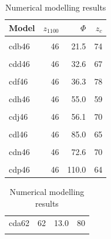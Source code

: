 \documentclass[draft,linenumbers]{agujournal2018} %
\providecommand{\DIFaddbegin}{} %
\providecommand{\DIFdelend}{} %
\newcommand{\DIFaddincludegraphics}[2][]{{\color{blue}\fbox{\DIFOincludegraphics[#1]{#2}}}} %
\DeclareRobustCommand{\DIFaddbegin}{\DIFOaddbegin \let\includegraphics\DIFaddincludegraphics} %
\DeclareRobustCommand{\DIFdelend}{\DIFOaddend \let\includegraphics\DIFOincludegraphics} %
\begin{document}
\DIFdelend \DIFaddbegin \begin{landscape}\begin{table}
\caption{\label{tab:zc.results}Numerical modelling results}

\centering
\fontsize{8}{10}\selectfont
\begin{tabular}[t]{lrrr}
\toprule
Model & $z_{1100}$ & $\Phi$ & \vphantom{3} $z_c$\\
\midrule
\cellcolor{gray!6}{cda46} & \cellcolor{gray!6}{46} & \cellcolor{gray!6}{13.0} & \cellcolor{gray!6}{66}\\
cdb46 & 46 & 21.5 & 74\\
\cellcolor{gray!6}{cdc46} & \cellcolor{gray!6}{46} & \cellcolor{gray!6}{26.1} & \cellcolor{gray!6}{69}\\
cdd46 & 46 & 32.6 & 67\\
\cellcolor{gray!6}{cde46} & \cellcolor{gray!6}{46} & \cellcolor{gray!6}{22.0} & \cellcolor{gray!6}{72}\\
\addlinespace
cdf46 & 46 & 36.3 & 78\\
\cellcolor{gray!6}{cdg46} & \cellcolor{gray!6}{46} & \cellcolor{gray!6}{44.0} & \cellcolor{gray!6}{78}\\
cdh46 & 46 & 55.0 & 59\\
\cellcolor{gray!6}{cdi46} & \cellcolor{gray!6}{46} & \cellcolor{gray!6}{34.0} & \cellcolor{gray!6}{80}\\
cdj46 & 46 & 56.1 & 70\\
\addlinespace
\cellcolor{gray!6}{cdk46} & \cellcolor{gray!6}{46} & \cellcolor{gray!6}{68.0} & \cellcolor{gray!6}{58}\\
cdl46 & 46 & 85.0 & 65\\
\cellcolor{gray!6}{cdm46} & \cellcolor{gray!6}{46} & \cellcolor{gray!6}{44.0} & \cellcolor{gray!6}{79}\\
cdn46 & 46 & 72.6 & 70\\
\cellcolor{gray!6}{cdo46} & \cellcolor{gray!6}{46} & \cellcolor{gray!6}{88.0} & \cellcolor{gray!6}{68}\\
\addlinespace
cdp46 & 46 & 110.0 & 64\\
\bottomrule
\end{tabular}
\centering
\begin{tabular}[t]{lrrr}
\toprule
\cellcolor{gray!6}{Model} & \cellcolor{gray!6}{$z_{1100}$} & \cellcolor{gray!6}{$\Phi$} & \cellcolor{gray!6}{\vphantom{2} $z_c$}\\
\midrule
cda62 & 62 & 13.0 & 80\\
\cellcolor{gray!6}{cdb62} & \cellcolor{gray!6}{62} & \cellcolor{gray!6}{21.5} & \cellcolor{gray!6}{79}\\

\end{tabular}
\end{table}
\end{landscape}
\end{document}
